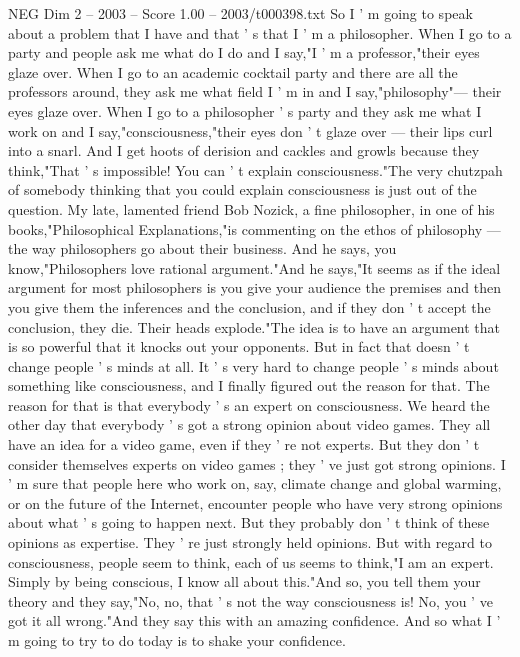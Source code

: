 \begin{textsample}{NEG Dim 2 – 2003 – Score 1.00 – 2003/t000398.txt}  \label{ex:f2_neg_017}
So I ' m going to speak about a problem that I have and that ' s that I ' m a philosopher.
When I go to a party and people ask me what do I do and I say,"I ' m a professor,"their eyes glaze over.
When I go to an academic cocktail party and there are all the professors around, they ask me what field I ' m in and I say,"philosophy"— their eyes glaze over.
When I go to a philosopher ' s party and they ask me what I work on and I say,"consciousness,"their eyes don ' t glaze over — their lips curl into a snarl.
And I get hoots of derision and cackles and growls because they think,"That ' s impossible!
You can ' t explain consciousness."The very chutzpah of somebody thinking that you could explain consciousness is just out of the question.
My late, lamented friend Bob Nozick, a fine philosopher, in one of his books,"Philosophical Explanations,"is commenting on the ethos of philosophy — the way philosophers go about their business.
And he says, you know,"Philosophers love rational argument."And he says,"It seems as if the ideal argument for most philosophers is you give your audience the premises and then you give them the inferences and the conclusion, and if they don ' t accept the conclusion, they die.
Their heads explode."The idea is to have an argument that is so powerful that it knocks out your opponents.
But in fact that doesn ' t change people ' s minds at all.
It ' s very hard to change people ' s minds about something like consciousness, and I finally figured out the reason for that.
The reason for that is that everybody ' s an expert on consciousness.
We heard the other day that everybody ' s got a strong opinion about video games.
They all have an idea for a video game, even if they ' re not experts.
But they don ' t consider themselves experts on video games ; they ' ve just got strong opinions.
I ' m sure that people here who work on, say, climate change and global warming, or on the future of the Internet, encounter people who have very strong opinions about what ' s going to happen next.
But they probably don ' t think of these opinions as expertise.
They ' re just strongly held opinions.
But with regard to consciousness, people seem to think, each of us seems to think,"I am an expert.
Simply by being conscious, I know all about this."And so, you tell them your theory and they say,"No, no, that ' s not the way consciousness is!
No, you ' ve got it all wrong."And they say this with an amazing confidence.
And so what I ' m going to try to do today is to shake your confidence.

\end{textsample}
